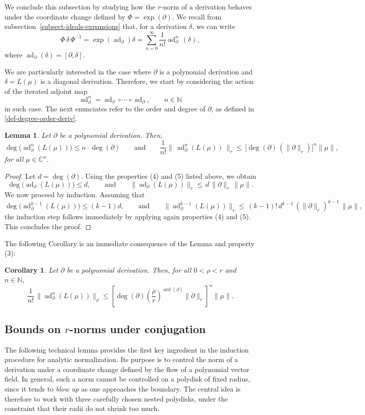 \documentclass[10pt,twoside,reqno]{amsart}
\newtheorem{corollary}[thm]{Corollary}
\newtheorem{lemma}[thm]{Lemma}
\theoremstyle{remark}
\theoremstyle{remark}
\newcommand{\N}{\mathbb{N}}
\newcommand{\C}{\mathbb{C}}
\newcommand{\ad}{\operatorname{ad}}
\newcommand{\tmop}[1]{{\operatorname{#1}}}
\begin{document}
We conclude this subsection by studying how the $r$-norm of a derivation behaves under the coordinate change defined by $\Phi=\exp(\partial)$. We recall from subsection~\ref{subsect-ideals-expansions} that, for a derivation $\delta$, we can write
$$
\Phi \, \delta \, \Phi^{-1} = \exp(\ad_\partial) \delta = \sum_{n=0}^\infty \frac{1}{n!} \ad_\partial^n\, (\delta),
$$
where $\ad_\partial(\delta) = [\partial,\delta]$.  

We are particularly interested in the case where $\partial$ is a polynomial derivation and $\delta = L(\mu)$ is a diagonal derivation.  
Therefore, we start by considering the action of the iterated adjoint map
$$
\ad_\partial^n = \ad_\partial \circ \cdots \circ \ad_\partial,\qquad n\in \N
$$
in such case. The next enunciates refer to the order and degree of $\partial$, as defined in \eqref{def-degree-order-deriv}.
\begin{lemma}\label{lem:rnormadjoint}
    Let $\partial$ be a polynomial derivation. Then,
    $$\deg\big( \ad_\partial^n(L(\mu))\big) \le n\cdot \deg(\partial)\qquad\text{and}\qquad \frac{1}{n!}\| \,\ad_\partial^n(L(\mu))\, \|_r\leq \, \Big[\deg(\partial) \, (\|\partial\|_r)\Big]^n \|\mu\|,$$
for all $\mu \in \C^n$.
\end{lemma}
\begin{proof}
Let $d = \deg(\partial)$. Using the properties (4) and (5) listed above, we obtain 
$$
\deg\big( \ad_\partial(L(\mu))\big) \leq d, \qquad\text{and}\qquad \|\ad_\partial(L(\mu))\|_r \leq \, d\, \|\partial\|_r \, \|\mu\|.
$$
We now proceed by induction. Assuming that 
$$
\deg\big( \ad_\partial^{k-1}(L(\mu))\big) \le (k-1) d, \qquad\text{and}\qquad \|\ad_\partial^{k-1}(L(\mu))\|_r \leq \,(k-1)!\, d^{k-1}\, (\|\partial\|_r)^{k-1}\, \|\mu\|,
$$
the induction step follows immediately by applying again properties (4) and (5). This concludes the proof.
\end{proof}
The following Corollary is an immediate consequence of the Lemma and property (3):
\begin{corollary}\label{Corollary-estimate-deg-ord}
Let $\partial$ be a polynomial derivation. Then, for all $0<\rho<r$ and $n \in \N$, 
$$
\frac{1}{n!}\, \|  \ad_\partial^n (L (\mu))  \|_{\rho} \leq
\left[ \deg (\partial)  \left( \frac{\rho}{r}\right)^{\tmop{ord} (\partial)} \|\partial\|_r
\right]^n 
 \| \mu \|.
$$
\end{corollary}
\subsection{Bounds on $r$-norms under conjugation}	
The following technical lemma provides the first key ingredient in the induction procedure for analytic normalization. Its purpose is to control the norm of a derivation under a coordinate change defined by the flow of a polynomial vector field. In general, such a norm cannot be controlled on a polydisk of fixed radius, since it tends to {\em blow up} as one approaches the boundary. The central idea is therefore to work with three carefully chosen nested polydisks, under the constraint that their radii do not shrink too much.
\end{document}
